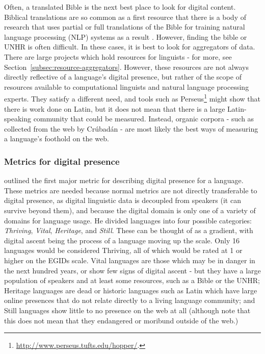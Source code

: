 Often, a translated Bible is the next best place to look for digital content. Biblical translations are so common as a first resource that there is a body of research that uses partial or full translations of the Bible for training natural language processing (NLP) systems as a result \citep{chew2006evaluation, agic2015if}. However, finding the bible or UNHR is often difficult. In these cases, it is best to look for aggregators of data. There are large projects which hold resources for linguists - for more, see Section~\ref{subsec:resource-aggregators}. However, these resources are not always directly reflective of a language's digital presence, but rather of the scope of resources available to computational linguists and natural language processing experts. They satisfy a different need, and tools such as Perseus\footnote{\href{http://www.perseus.tufts.edu/hopper/}{http://www.perseus.tufts.edu/hopper/}. } might show that there is work done on Latin, but it does not mean that there is a large Latin-speaking community that could be measured. Instead, organic corpora - such as collected from the web by Cr\'ubad\'an - are most likely the best ways of measuring a language's foothold on the web.

\subsubsection{Metrics for digital presence}

\citet{kornai2013digital} outlined the first major metric for describing digital presence for a language. These metrics are needed because normal metrics are not directly transferable to digital presence, as digital linguistic data is decoupled from speakers (it can survive beyond them), and because the digital domain is only one of a variety of domains for language usage. He divided languages into four possible categories: {\it Thriving}, {\it Vital}, {\it Heritage}, and {\it Still}. These can be thought of as a gradient, with digital ascent being the process of a language moving up the scale. Only 16 languages would be considered Thriving, all of which would be rated at 1 or higher on the EGIDs scale. Vital languages are those which may be in danger in the next hundred years, or show few signs of digital ascent - but they have a large population of speakers and at least some resources, such as a Bible or the UNHR; Heritage languages are dead or historic languages such as Latin which have large online presences that do not relate directly to a living language community; and Still languages show little to no presence on the web at all (although note that this does not mean that they endangered or moribund outside of the web.)

